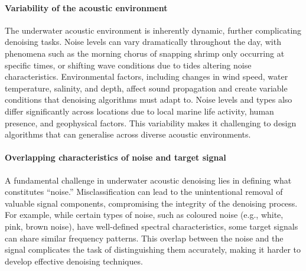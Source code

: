 \paragraph{Variability of the acoustic environment}
The underwater acoustic environment is inherently dynamic, further complicating denoising tasks. Noise levels can vary dramatically throughout the day, with phenomena such as the morning chorus of snapping shrimp only occurring at specific times, or shifting wave conditions due to tides altering noise characteristics. Environmental factors, including changes in wind speed, water temperature, salinity, and depth, affect sound propagation and create variable conditions that denoising algorithms must adapt to. Noise levels and types also differ significantly across locations due to local marine life activity, human presence, and geophysical factors. This variability makes it challenging to design algorithms that can generalise across diverse acoustic environments.

\paragraph{Overlapping characteristics of noise and target signal}
A fundamental challenge in underwater acoustic denoising lies in defining what constitutes ``noise.'' Misclassification can lead to the unintentional removal of valuable signal components, compromising the integrity of the denoising process. For example, while certain types of noise, such as coloured noise (e.g., white, pink, brown noise), have well-defined spectral characteristics, some target signals can share similar frequency patterns. This overlap between the noise and the signal complicates the task of distinguishing them accurately, making it harder to develop effective denoising techniques.



